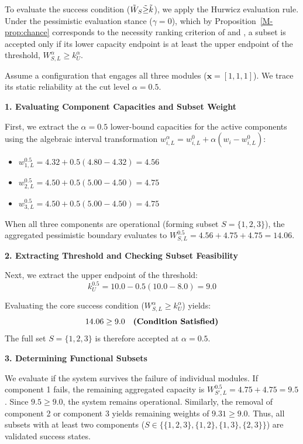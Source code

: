 \documentclass[11pt]{article}
\begin{document}
To evaluate the success condition ($\tilde{W}_S \tilde{\ge} \tilde{k}$), we apply the Hurwicz evaluation rule. Under the pessimistic evaluation stance ($\gamma = 0$), which by Proposition~\ref*{M-prop:chance} corresponds to the necessity ranking criterion of \citet{DuboisPrade1983} and \citet{InuiguchiRamik2000}, a subset is accepted only if its lower capacity endpoint is at least the upper endpoint of the threshold, $W_{S,L}^\alpha \ge k_U^\alpha$.

Assume a configuration that engages all three modules ($\mathbf{x} = [1,1,1]$). We trace its static reliability at the cut level $\alpha = 0.5$.

\textbf{1. Evaluating Component Capacities and Subset Weight}

First, we extract the $\alpha=0.5$ lower-bound capacities for the active components using the algebraic interval transformation $w_{i,L}^\alpha = w_{i,L}^0 + \alpha(w_i - w_{i,L}^0)$:
\begin{itemize}
    \item $w_{1,L}^{0.5} = 4.32 + 0.5(4.80 - 4.32) = 4.56$
    \item $w_{2,L}^{0.5} = 4.50 + 0.5(5.00 - 4.50) = 4.75$
    \item $w_{3,L}^{0.5} = 4.50 + 0.5(5.00 - 4.50) = 4.75$
\end{itemize}
When all three components are operational (forming subset $S = \{1,2,3\}$), the aggregated pessimistic boundary evaluates to $W_{S,L}^{0.5} = 4.56 + 4.75 + 4.75 = 14.06$.

\textbf{2. Extracting Threshold and Checking Subset Feasibility}

Next, we extract the upper endpoint of the threshold:
\begin{equation}
    k_U^{0.5} = 10.0 - 0.5(10.0 - 8.0) = 9.0
\end{equation}


Evaluating the core success condition ($W_{S,L}^\alpha \ge k_U^\alpha$) yields:
\begin{equation}
    14.06 \ge 9.0 \quad \text{\textbf{(Condition Satisfied)}}
\end{equation}
The full set $S=\{1,2,3\}$ is therefore accepted at $\alpha=0.5$. 

\textbf{3. Determining Functional Subsets}

We evaluate if the system survives the failure of individual modules. If component 1 fails, the remaining aggregated capacity is $W_{S',L}^{0.5} = 4.75 + 4.75 = 9.5$. Since $9.5 \ge 9.0$, the system remains operational. Similarly, the removal of component 2 or component 3 yields remaining weights of $9.31 \ge 9.0$. Thus, all subsets with at least two components ($S \in \{\{1,2,3\}, \{1,2\}, \{1,3\}, \{2,3\}\}$) are validated success states.
\end{document}

